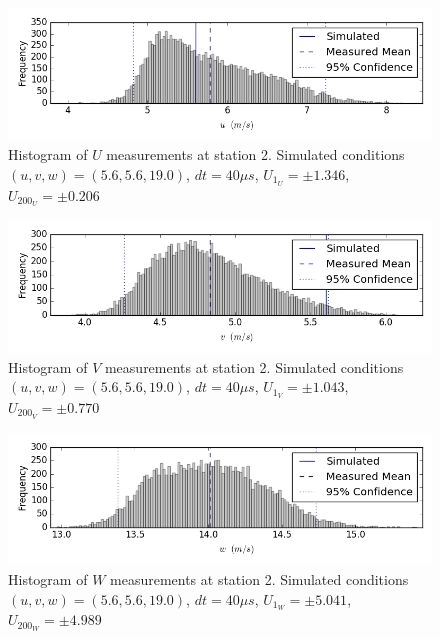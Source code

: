 \begin{figure}[H]
\centering
\includegraphics[width=6in]{figs/Ely_May28th02002/uncertainty_Ely_May28th02002_U}
\caption{Histogram of $U$ measurements at station 2. Simulated conditions $(u,v,w)=(5.6, 5.6, 19.0)$, $dt=40 \mu s$, $U_1_U=\pm 1.346$, $U_200_U=\pm 0.206$}
\label{fig:uncertainty_Ely_May28th02002_U}
\end{figure}


\begin{figure}[H]
\centering
\includegraphics[width=6in]{figs/Ely_May28th02002/uncertainty_Ely_May28th02002_V}
\caption{Histogram of $V$ measurements at station 2. Simulated conditions $(u,v,w)=(5.6, 5.6, 19.0)$, $dt=40 \mu s$, $U_1_V=\pm 1.043$, $U_200_V=\pm 0.770$}
\label{fig:uncertainty_Ely_May28th02002_V}
\end{figure}


\begin{figure}[H]
\centering
\includegraphics[width=6in]{figs/Ely_May28th02002/uncertainty_Ely_May28th02002_W}
\caption{Histogram of $W$ measurements at station 2. Simulated conditions $(u,v,w)=(5.6, 5.6, 19.0)$, $dt=40 \mu s$, $U_1_W=\pm 5.041$, $U_200_W=\pm 4.989$}
\label{fig:uncertainty_Ely_May28th02002_W}
\end{figure}


